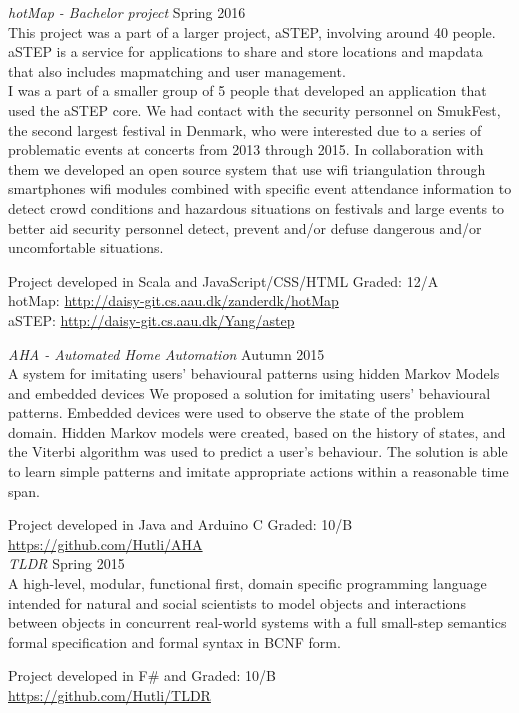 \documentclass[margin, 10pt]{res} %
\begin{document}
\begin{resume}
{\sl hotMap - Bachelor project} \hfill Spring 2016 \\
This project was a part of a larger project, aSTEP, involving around 40 people. aSTEP is a service for applications to share and store locations and mapdata that also includes mapmatching and user management.\\
I was a part of a smaller group of 5 people that developed an application that used the aSTEP core. We had contact with the security personnel on SmukFest, the second largest festival in Denmark, who were interested due to a series of problematic events at concerts from 2013 through 2015. In collaboration with them we developed an open source system that use wifi triangulation through smartphones wifi modules combined with specific event attendance information to detect crowd conditions and hazardous situations on festivals and large events to better aid security personnel detect, prevent and/or defuse dangerous and/or uncomfortable situations.

Project developed in Scala and JavaScript/CSS/HTML \hfill Graded: 12/A\\
hotMap: \url{http://daisy-git.cs.aau.dk/zanderdk/hotMap}\\
aSTEP: \url{http://daisy-git.cs.aau.dk/Yang/astep}

{\sl AHA - Automated Home Automation} \hfill Autumn 2015 \\
A system for imitating users’ behavioural patterns using hidden Markov Models and embedded devices We proposed a solution for imitating users’ behavioural patterns. Embedded devices were used to observe the state of the problem domain. Hidden Markov models were created, based on the history of states, and the Viterbi algorithm was used to predict a user’s behaviour. The solution is able to learn simple patterns and imitate appropriate actions within a reasonable time span.

Project developed in Java and Arduino C \hfill Graded: 10/B \\
\url{https://github.com/Hutli/AHA} \\

{\sl TLDR} \hfill Spring 2015 \\
A high-level, modular, functional first, domain specific programming language intended for natural and social scientists to model objects and interactions between objects in concurrent real-world systems with a full small-step semantics formal specification and formal syntax in BCNF form.

Project developed in F\# and \hfill Graded: 10/B \\
\url{https://github.com/Hutli/TLDR}


\end{resume}
\end{document}
